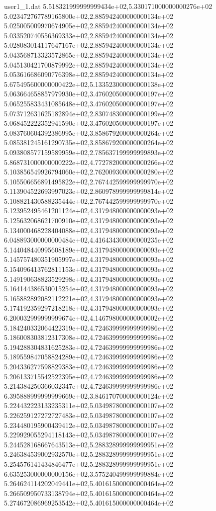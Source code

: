\begin{filecontents}{user1_1.dat}
5.518321999999999434e+02,5.330171000000000276e+02
5.023472767789165800e+02,2.885942400000000134e+02
5.025005009970674905e+02,2.885942400000000134e+02
5.033520740556369333e+02,2.885942400000000134e+02
5.028083014117647167e+02,2.885942400000000134e+02
5.043568713323572865e+02,2.885942400000000134e+02
5.045130421700879992e+02,2.885942400000000134e+02
5.053616686090776398e+02,2.885942400000000134e+02
5.675495600000000422e+02,5.133523000000000138e+02
5.063664658857979930e+02,3.476020500000000197e+02
5.065255833431085648e+02,3.476020500000000197e+02
5.073712631625182894e+02,2.830748300000000199e+02
5.068452222352941590e+02,3.476020500000000197e+02
5.083760604392386995e+02,3.858679200000000264e+02
5.085381245161290735e+02,3.858679200000000264e+02
5.093808577159589959e+02,2.785637199999999893e+02
5.868731000000000222e+02,4.772782000000000266e+02
5.103856549926794060e+02,2.762009300000000280e+02
5.105506656891495822e+02,2.767442599999999970e+02
5.113904522693997023e+02,2.860978999999999814e+02
5.108821430588235444e+02,2.767442599999999970e+02
5.123952495461201124e+02,4.317948000000000093e+02
5.125632068621700910e+02,4.317948000000000093e+02
5.134000468228404088e+02,4.317948000000000093e+02
6.048893000000000484e+02,4.416434300000000235e+02
5.144048440995608189e+02,4.317948000000000093e+02
5.145757480351905997e+02,4.317948000000000093e+02
5.154096413762811153e+02,4.317948000000000093e+02
5.149190638823529298e+02,4.317948000000000093e+02
5.164144386530015254e+02,4.317948000000000093e+02
5.165882892082112221e+02,4.317948000000000093e+02
5.174192359297218218e+02,4.317948000000000093e+02
6.200032999999999674e+02,4.146798000000000002e+02
5.184240332064422319e+02,4.724639999999999986e+02
5.186008303812317308e+02,4.724639999999999986e+02
5.194288304831625283e+02,4.724639999999999986e+02
5.189559847058824289e+02,4.724639999999999986e+02
5.204336277598829383e+02,4.724639999999999986e+02
5.206133715542522395e+02,4.724639999999999986e+02
5.214384250366032347e+02,4.724639999999999986e+02
6.395888999999999669e+02,3.846170700000000124e+02
5.224432223133235311e+02,5.034987800000000107e+02
5.226259127272727483e+02,5.034987800000000107e+02
5.234480195900439412e+02,5.034987800000000107e+02
5.229929055294118143e+02,5.034987800000000107e+02
5.244528168667643513e+02,5.288328999999999951e+02
5.246384539002932570e+02,5.288328999999999951e+02
5.254576141434846477e+02,5.288328999999999951e+02
6.635253000000000156e+02,3.575240499999999884e+02
5.264624114202049441e+02,5.401615000000000464e+02
5.266509950733138794e+02,5.401615000000000464e+02
5.274672086969253542e+02,5.401615000000000464e+02

\end{filecontents}
